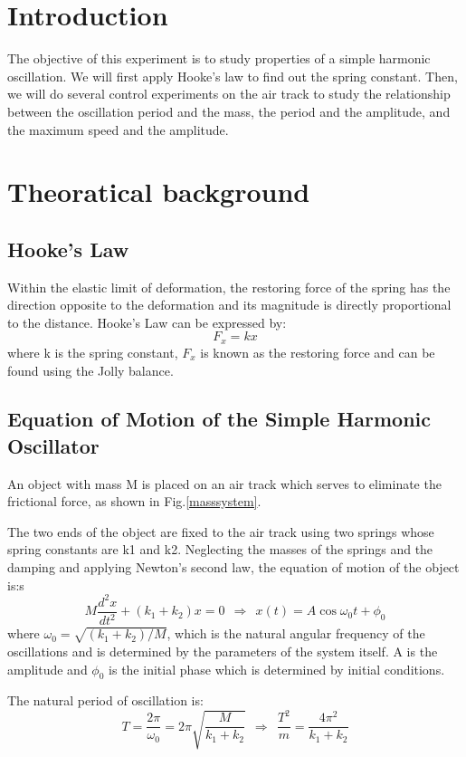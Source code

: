 \documentclass[12pt,a4paper]{article}
\begin{document}
\section{Introduction}
The objective of this experiment is to study properties of a simple harmonic oscillation. We will first apply Hooke’s law to find out the spring constant. Then, we will do several control experiments on the air track to study the relationship between the oscillation period and the mass, the period and the amplitude, and the maximum speed and the amplitude.

\section{Theoratical background}
\subsection{Hooke's Law}
Within the elastic limit of deformation, the restoring force of the spring has the direction opposite to the deformation and its magnitude is directly proportional to the distance. Hooke’s Law can be expressed by:
\begin{equation}
    F_x=kx
\end{equation}
where k is the spring constant, $F_x$ is known as the restoring force and can be found using the Jolly balance.
\subsection{Equation of Motion of the Simple Harmonic Oscillator}
An object with mass M is placed on an air track which serves to eliminate the frictional force, as shown in Fig.\ref{masssystem}. 

The two ends of the object are fixed to the air track using two springs whose spring constants are k1 and k2. Neglecting the masses of the springs and the damping and applying Newton’s second law, the equation of motion of the object is:s
\begin{equation}
    M\frac{d^2x}{dt^2}+(k_1+k_2)x=0\ \ \Rightarrow\ \ x(t)=A\cos{\omega_0t+\phi_0}
\end{equation}
where $\omega_0=\sqrt{(k_1+k_2)/M}$, which is the natural angular frequency of the oscillations and is determined by the parameters of the system itself. A is the amplitude and $\phi_0$ is the initial phase which is determined by initial conditions.\par 
The natural period of oscillation is:
\begin{equation}
    T=\frac{2\pi}{\omega_0}=2\pi\sqrt{\frac{M}{k_1+k_2}}\ \ \Rightarrow\ \     \frac{T^2}{m}=\frac{4\pi^2}{k_1+k_2}
\end{equation}
\end{document}
